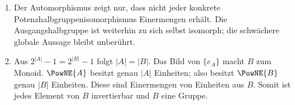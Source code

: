 \documentclass[main.tex]{subfiles}
\begin{document}
\begin{enumerate}
  \item Der Automorphismus zeigt nur, dass nicht jeder konkrete
    Potenzhalbgruppenisomorphismus Einermengen erhält.  Die
    Ausgangshalbgruppe ist weiterhin zu sich selbst isomorph; die schwächere
    globale Aussage bleibt unberührt.

  \item Aus \(2^{|A|}-1=2^{|B|}-1\) folgt \(|A|=|B|\).  Das Bild von
    \(\{e_A\}\) macht \(B\) zum Monoid.  \(\PowNE{A}\) besitzt genau
    \(|A|\) Einheiten; also besitzt \(\PowNE{B}\) genau \(|B|\) Einheiten.
    Diese sind Einermengen von Einheiten aus \(B\).  Somit ist jedes Element
    von \(B\) invertierbar und \(B\) eine Gruppe.
\end{enumerate}
\end{document}
